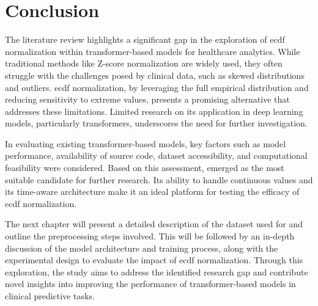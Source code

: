 \section{Conclusion}

The literature review highlights a significant gap in the exploration of \gls{ecdf} normalization within transformer-based models for healthcare analytics. While traditional methods like Z-score normalization are widely used, they often struggle with the challenges posed by clinical data, such as skewed distributions and outliers. \gls{ecdf} normalization, by leveraging the full empirical distribution and reducing sensitivity to extreme values, presents a promising alternative that addresses these limitations. Limited research on its application in deep learning models, particularly transformers, underscores the need for further investigation.

In evaluating existing transformer-based models, key factors such as model performance, availability of source code, dataset accessibility, and computational feasibility were considered. Based on this assessment,  emerged as the most suitable candidate for further research. Its ability to handle continuous values and its time-aware architecture make it an ideal platform for testing the efficacy of \gls{ecdf} normalization.

The next chapter will present a detailed description of the dataset used for  and outline the preprocessing steps involved. This will be followed by an in-depth discussion of the model architecture and training process, along with the experimental design to evaluate the impact of \gls{ecdf} normalization. Through this exploration, the study aims to address the identified research gap and contribute novel insights into improving the performance of transformer-based models in clinical predictive tasks.

